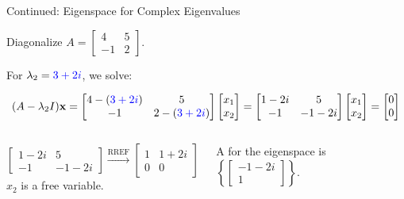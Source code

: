 \documentclass[xcolor=dvipsnames,aspectratio=169,t]{beamer}
\begin{document}
\begin{frame}{Continued: Eigenspace for Complex Eigenvalues}
  \begin{example}
  Diagonalize $A = \begin{bmatrix} 4 & 5 \\ -1 & 2 \end{bmatrix}$.
  \end{example}

  For $\lambda_2 = \textcolor{blue}{3+2i}$, we solve:

  \[ (A - \lambda_2 I)\mathbf{x}
  = \begin{bmatrix} 4-(\textcolor{blue}{3+2i}) & 5 \\ -1 & 2-(\textcolor{blue}{3+2i}) \end{bmatrix} \begin{bmatrix} x_1 \\ x_2 \end{bmatrix}
  = \begin{bmatrix} 1-2i & 5 \\ -1 & -1-2i \end{bmatrix} \begin{bmatrix} x_1 \\ x_2 \end{bmatrix}
  = \begin{bmatrix} 0 \\ 0 \end{bmatrix}
  \]

  \pause
  \begin{columns}[T]
  \[
    \begin{bmatrix} 1-2i & 5 \\ -1 & -1-2i \end{bmatrix}
    \xrightarrow{\text{RREF}}
    \begin{bmatrix} 1 & 1+2i \\ 0 & 0 \end{bmatrix}
  \]
  \hfill $x_2$ is a \alert{free variable}. \hspace*{2em}
  
  \bigskip
  
  \pause
  A  for the eigenspace is 
  $\left\{ \begin{bmatrix} -1-2i \\ 1 \end{bmatrix} \right\}$.
  \end{columns}
\end{frame}
\end{document}
